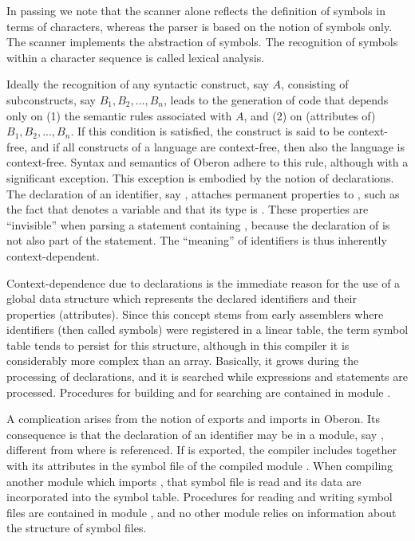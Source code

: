 In passing we note that the scanner alone reflects the definition of symbols in terms of characters, whereas the parser is based on the notion of symbols only. The scanner implements the abstraction of symbols. The recognition of symbols within a character sequence is called lexical analysis.

Ideally the recognition of any syntactic construct, say $A$, consisting of subconstructs, say $B_1, B_2, ... , B_n$, leads to the generation of code that depends only on (1) the semantic rules associated with $A$, and (2) on (attributes of) $B_1, B_2, ... , B_n$. If this condition is satisfied, the construct is said to be context-free, and if all constructs of a language are context-free, then also the language is context-free. Syntax and semantics of Oberon adhere to this rule, although with a significant exception. This exception is embodied by the notion of declarations. The declaration of an identifier, say , attaches permanent properties to , such as the fact that  denotes a variable and that its type is . These properties are ``invisible'' when parsing a statement containing , because the declaration of  is not also part of the statement. The ``meaning'' of identifiers is thus inherently context-dependent.

Context-dependence due to declarations is the immediate reason for the use of a global data structure which represents the declared identifiers and their properties (attributes). Since this concept stems from early assemblers where identifiers (then called symbols) were registered in a linear table, the term symbol table tends to persist for this structure, although in this compiler it is considerably more complex than an array. Basically, it grows during the processing of declarations, and it is searched while expressions and statements are processed. Procedures for building and for searching are contained in module . %

A complication arises from the notion of exports and imports in Oberon. Its consequence is that the declaration of an identifier  may be in a module, say , different from where  is referenced. If  is exported, the compiler includes  together with its attributes in the symbol file of the compiled module . When compiling another module which imports , that symbol file is read and its data are incorporated into the symbol table. Procedures for reading and writing symbol files are contained in module , and no other module relies on information about the structure of symbol files.

